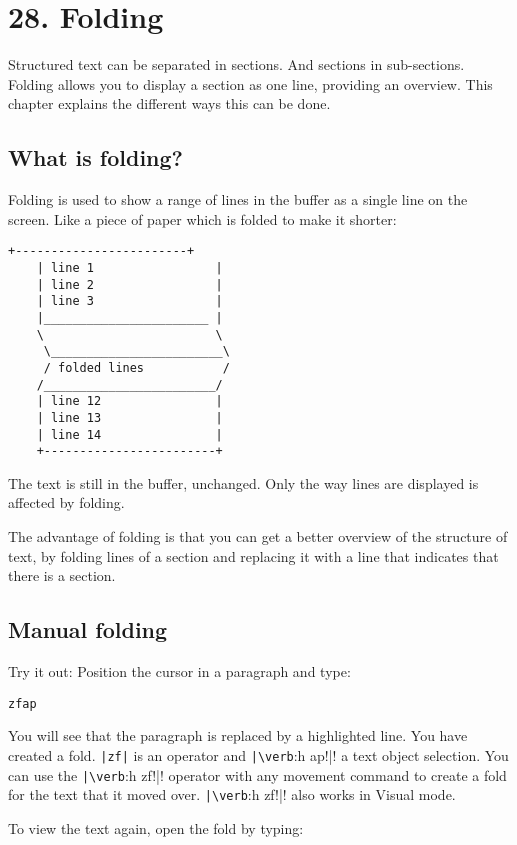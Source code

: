 \section{28. Folding}
Structured text can be separated in sections.  And sections in sub-sections.
Folding allows you to display a section as one line, providing an overview.
This chapter explains the different ways this can be done.
\subsection{What is folding?}
Folding is used to show a range of lines in the buffer as a single line on the screen.
Like a piece of paper which is folded to make it shorter:

\begin{Verbatim}[samepage=true]
    +------------------------+
    | line 1                 |
    | line 2                 |
    | line 3                 |
    |_______________________ |
    \                        \
     \________________________\
     / folded lines           /
    /________________________/
    | line 12                |
    | line 13                |
    | line 14                |
    +------------------------+
\end{Verbatim}

The text is still in the buffer, unchanged.
Only the way lines are displayed is affected by folding.

The advantage of folding is that you can get a better overview of the structure of text, by folding lines of a section and replacing it with a line that indicates that there is a section.
\subsection{Manual folding}
Try it out: Position the cursor in a paragraph and type:

\begin{Verbatim}[samepage=true]
 zfap
\end{Verbatim}

You will see that the paragraph is replaced by a highlighted line.
You have created a fold.
\verb!|zf|! is an operator and \verb!|\verb!:h ap!|! a text object selection.
You can use the \verb!|\verb!:h zf!|! operator with any movement command to create a fold for the text that it moved over.
\verb!|\verb!:h zf!|! also works in Visual mode.

To view the text again, open the fold by typing:

